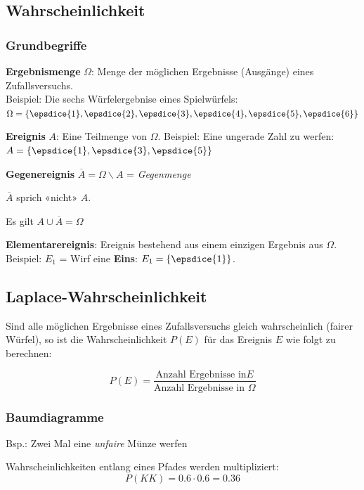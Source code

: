 \begin{multicols}{2}


\subsection*{Wahrscheinlichkeit}
\subsubsection*{Grundbegriffe}

\textbf{Ergebnismenge} $\Omega$: Menge der möglichen Ergebnisse
(Ausgänge) eines Zufallsversuchs.\\
Beispiel: Die sechs Würfelergebnise
eines Spielwürfels: $\Omega = \left\{\epsdice{1}, \epsdice{2}, \epsdice{3}, \epsdice{4}, \epsdice{5}, \epsdice{6}\right\}$

\textbf{Ereignis} $A$: Eine Teilmenge von $\Omega$. Beispiel: Eine
ungerade Zahl zu werfen: $A  = \left\{\epsdice{1}, \epsdice{3}, \epsdice{5}\right\}$

\textbf{Gegenereignis} $\overline{A} = \Omega \backslash A$ =
\textit{Gegenmenge}

$\overline{A}$ sprich «nicht» $A$.

Es gilt $A \cup \overline{A} = \Omega$

\textbf{Elementarereignis}: Ereignis bestehend aus einem einzigen
Ergebnis aus $\Omega$. Beispiel: $E_1$ = Wirf eine \textbf{Eins}: $E_1
= \left\{\epsdice{1}\right\}$.

\forceCB


\subsection*{Laplace-Wahrscheinlichkeit}
Sind alle möglichen Ergebnisse eines Zufallsversuchs gleich
wahrscheinlich (fairer Würfel), so ist die Wahrscheinlichkeit $P(E)$ für das Ereignis
$E$ wie folgt zu berechnen:

$$P(E) = \frac{\textrm{Anzahl Ergebnisse in
}E}{\textrm{Anzahl Ergebnisse in }\Omega}$$

\forceCB
\subsubsection*{Baumdiagramme}
Bsp.: Zwei Mal eine \textit{unfaire} Münze werfen

Wahrscheinlichkeiten {\color{FarnFarbe}entlang} eines Pfades werden {\color{FarnFarbe}multipliziert}:
$$P(KK) = 0.6\cdot0.6=0.36$$


\end{multicols}
